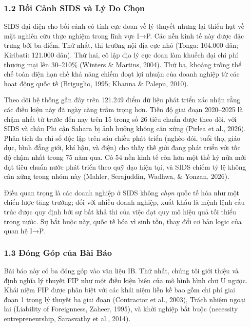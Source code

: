 \documentclass[12pt,a4paper]{article}
\begin{document}
\hypertarget{12-bux1ed1i-cux1ea3nh-sids-vuxe0-luxfd-do-chux1ecdn}{%
\subsubsection{1.2 Bối Cảnh SIDS và Lý Do
Chọn}\label{12-bux1ed1i-cux1ea3nh-sids-vuxe0-luxfd-do-chux1ecdn}}

SIDS đại diện cho bối cảnh có tính cực đoan về lý thuyết nhưng lại thiếu
hụt về mặt nghiên cứu thực nghiệm trong lĩnh vực I→P. Các nền kinh tế
này được đặc trưng bởi ba điểm. Thứ nhất, thị trường nội địa cực nhỏ
(Tonga: 104.000 dân; Kiribati: 121.000 dân). Thứ hai, cô lập địa lý cực
đoan làm khuếch đại chi phí thương mại lên 30--210\% (Winters \&
Martins, 2004). Thứ ba, khoảng trống thể chế toàn diện hạn chế khả năng
chiếm đoạt lợi nhuận của doanh nghiệp từ các hoạt động quốc tế
(Briguglio, 1995; Khanna \& Palepu, 2010).

Theo dõi hệ thống gần đây trên 121.249 điểm dữ liệu phát triển xác nhận
rằng các điều kiện này đã ngày càng trầm trọng hơn. Tiến độ giai đoạn
2020--2025 là chậm nhất từ trước đến nay trên 15 trong số 26 tiêu chuẩn
được theo dõi, với SIDS và châu Phi cận Sahara bị ảnh hưởng không cân
xứng (Pirlea et al., 2026). Phân tích đa chỉ số độc lập trên sáu chiều
phát triển (nghèo đói, tuổi thọ, giáo dục, bình đẳng giới, khí hậu, và
điện) cho thấy thế giới đang phát triển với tốc độ chậm nhất trong 75
năm qua. Có 54 nền kinh tế còn hơn một thế kỷ nữa mới đạt tiêu chuẩn
nước phát triển theo quỹ đạo hiện tại, và SIDS chiếm tỷ lệ không cân
xứng trong nhóm này (Mahler, Serajuddin, Wadhwa, \& Yonzan, 2026).

Điều quan trọng là các doanh nghiệp ở SIDS không \emph{chọn} quốc tế hóa
như một chiến lược tăng trưởng; đối với nhiều doanh nghiệp, xuất khẩu là
mệnh lệnh cấu trúc được quy định bởi sự bất khả thi của việc đạt quy mô
hiệu quả tối thiểu trong nước. Sự bắt buộc này, quốc tế hóa vì sinh tồn,
thay đổi cơ bản logic của quan hệ I→P.

\hypertarget{13-ux111uxf3ng-guxf3p-cux1ee7a-buxe0i-buxe1o}{%
\subsubsection{1.3 Đóng Góp của Bài
Báo}\label{13-ux111uxf3ng-guxf3p-cux1ee7a-buxe0i-buxe1o}}

Bài báo này có ba đóng góp vào văn liệu IB. Thứ nhất, chúng tôi giới
thiệu và định nghĩa lý thuyết FIP như một điều kiện biên của mô hình
hình chữ U ngược. Khái niệm FIP được phân biệt với các khái niệm liền kề
bao gồm chi phí giai đoạn 1 trong lý thuyết ba giai đoạn (Contractor et
al., 2003), Trách nhiệm ngoại lai (Liability of Foreignness, Zaheer,
1995), và khởi nghiệp bắt buộc (necessity entrepreneurship, Sarasvathy
et al., 2014).
\end{document}
